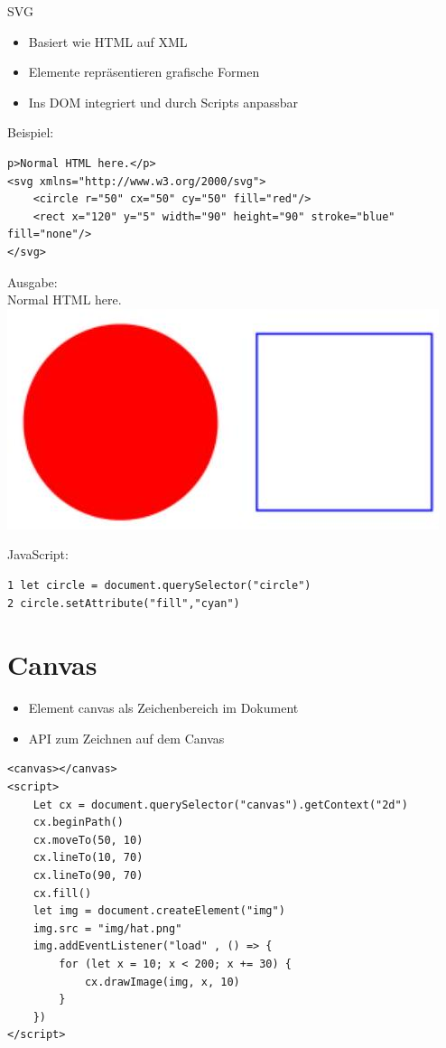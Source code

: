 \documentclass[10pt]{article}
\begin{document}
SVG

\begin{itemize}
  \item Basiert wie HTML auf XML
  \item Elemente repräsentieren grafische Formen
  \item Ins DOM integriert und durch Scripts anpassbar
\end{itemize}

Beispiel:

\begin{verbatim}
p>Normal HTML here.</p>
<svg xmlns="http://www.w3.org/2000/svg">
    <circle r="50" cx="50" cy="50" fill="red"/>
    <rect x="120" y="5" width="90" height="90" stroke="blue" fill="none"/>
</svg>
\end{verbatim}

Ausgabe:\\
Normal HTML here.\\
\includegraphics[max width=\textwidth, center]{2024_12_29_858f09cde51177c71657g-27}

JavaScript:

\begin{verbatim}
1 let circle = document.querySelector("circle")
2 circle.setAttribute("fill","cyan")
\end{verbatim}

\section*{Canvas}
\begin{itemize}
  \item Element canvas als Zeichenbereich im Dokument
  \item API zum Zeichnen auf dem Canvas
\end{itemize}

\begin{verbatim}
<canvas></canvas>
<script>
    Let cx = document.querySelector("canvas").getContext("2d")
    cx.beginPath()
    cx.moveTo(50, 10)
    cx.lineTo(10, 70)
    cx.lineTo(90, 70)
    cx.fill()
    let img = document.createElement("img")
    img.src = "img/hat.png"
    img.addEventListener("load" , () => {
        for (let x = 10; x < 200; x += 30) {
            cx.drawImage(img, x, 10)
        }
    })
</script>
\end{verbatim}
\end{document}
